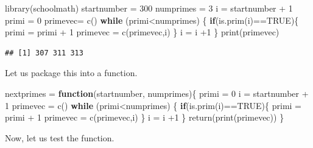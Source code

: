 \documentclass[
]{article}
\newenvironment{Shaded}{\begin{snugshade}}{\end{snugshade}}
\newcommand{\ConstantTok}[1]{\textcolor[rgb]{0.00,0.00,0.00}{#1}}
\newcommand{\ControlFlowTok}[1]{\textcolor[rgb]{0.13,0.29,0.53}{\textbf{#1}}}
\newcommand{\DecValTok}[1]{\textcolor[rgb]{0.00,0.00,0.81}{#1}}
\newcommand{\FunctionTok}[1]{\textcolor[rgb]{0.00,0.00,0.00}{#1}}
\newcommand{\NormalTok}[1]{#1}
\newcommand{\OtherTok}[1]{\textcolor[rgb]{0.56,0.35,0.01}{#1}}
\newcommand{\SpecialCharTok}[1]{\textcolor[rgb]{0.00,0.00,0.00}{#1}}
\begin{document}
\begin{Shaded}
\begin{Highlighting}[]
\FunctionTok{library}\NormalTok{(schoolmath)}
\NormalTok{startnumber }\OtherTok{=} \DecValTok{300}
\NormalTok{numprimes }\OtherTok{=} \DecValTok{3}
\NormalTok{i }\OtherTok{=}\NormalTok{ startnumber }\SpecialCharTok{+} \DecValTok{1}
\NormalTok{primi }\OtherTok{=} \DecValTok{0}
\NormalTok{primevec}\OtherTok{=} \FunctionTok{c}\NormalTok{()}
\ControlFlowTok{while}\NormalTok{ (primi}\SpecialCharTok{\textless{}}\NormalTok{numprimes)}
\NormalTok{\{}
  \ControlFlowTok{if}\NormalTok{(}\FunctionTok{is.prim}\NormalTok{(i)}\SpecialCharTok{==}\ConstantTok{TRUE}\NormalTok{)\{}
\NormalTok{    primi }\OtherTok{=}\NormalTok{ primi }\SpecialCharTok{+} \DecValTok{1}
\NormalTok{    primevec }\OtherTok{=} \FunctionTok{c}\NormalTok{(primevec,i)}
\NormalTok{    \}}
\NormalTok{  i }\OtherTok{=}\NormalTok{ i }\SpecialCharTok{+}\DecValTok{1}
\NormalTok{\}}
\FunctionTok{print}\NormalTok{(primevec)}
\end{Highlighting}
\end{Shaded}

\begin{verbatim}
## [1] 307 311 313
\end{verbatim}

Let us package this into a function.

\begin{Shaded}
\begin{Highlighting}[]
\NormalTok{nextprimes }\OtherTok{=} \ControlFlowTok{function}\NormalTok{(startnumber, numprimes)\{}
\NormalTok{  primi }\OtherTok{=} \DecValTok{0}
\NormalTok{  i }\OtherTok{=}\NormalTok{ startnumber }\SpecialCharTok{+} \DecValTok{1}
\NormalTok{  primevec }\OtherTok{=} \FunctionTok{c}\NormalTok{()}
  \ControlFlowTok{while}\NormalTok{ (primi}\SpecialCharTok{\textless{}}\NormalTok{numprimes)}
\NormalTok{  \{}
    \ControlFlowTok{if}\NormalTok{(}\FunctionTok{is.prim}\NormalTok{(i)}\SpecialCharTok{==}\ConstantTok{TRUE}\NormalTok{)\{}
\NormalTok{      primi }\OtherTok{=}\NormalTok{ primi }\SpecialCharTok{+} \DecValTok{1}
\NormalTok{      primevec }\OtherTok{=} \FunctionTok{c}\NormalTok{(primevec,i)}
\NormalTok{    \}}
\NormalTok{  i }\OtherTok{=}\NormalTok{ i }\SpecialCharTok{+}\DecValTok{1}
\NormalTok{  \}}
  \FunctionTok{return}\NormalTok{(}\FunctionTok{print}\NormalTok{(primevec))}
\NormalTok{\}}
\end{Highlighting}
\end{Shaded}

Now, let us test the function.
\end{document}
